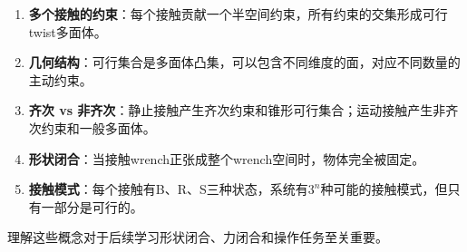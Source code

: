 \documentclass[12pt,a4paper]{article}
\begin{document}
\begin{enumerate}
\item \textbf{多个接触的约束}：每个接触贡献一个半空间约束，所有约束的交集形成可行twist多面体。

\item \textbf{几何结构}：可行集合是多面体凸集，可以包含不同维度的面，对应不同数量的主动约束。

\item \textbf{齐次 vs 非齐次}：静止接触产生齐次约束和锥形可行集合；运动接触产生非齐次约束和一般多面体。

\item \textbf{形状闭合}：当接触wrench正张成整个wrench空间时，物体完全被固定。

\item \textbf{接触模式}：每个接触有B、R、S三种状态，系统有$3^n$种可能的接触模式，但只有一部分是可行的。
\end{enumerate}

理解这些概念对于后续学习形状闭合、力闭合和操作任务至关重要。
\end{document}
